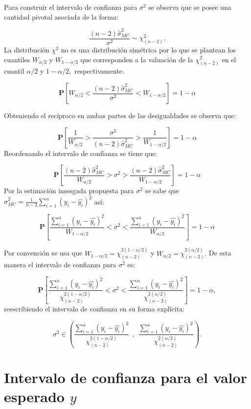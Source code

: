 \documentclass[a4paper,oneside,openany]{book}
\begin{document}
Para construir el intervalo de confianza para \(\sigma^2\) se observa
que se posee una cantidad pivotal asociada de la forma:

\[\frac{(n-2)\hat{\sigma}^2_{MC}}{\sigma^2}\sim \chi^2_{(n-2)}.\] La
distribución \(\chi^2\) no es una distribución simétrica por lo que se
plantean los cuantiles \(W_{\alpha/2}\) y \(W_{1-\alpha/2}\) que
corresponden a la valuación de la \(\chi^2_{(n-2)}\) en el cuantil
\(\alpha/2\) y \(1-\alpha/2,\) respectivamente.

\[\mathbf{P}\left[W_{\alpha/2}<\frac{(n-2)\hat{\sigma}^2_{MC}}{\sigma^2}< W_{1-\alpha/2}\right]=1-\alpha\]

Obteniendo el recíproco en ambas partes de las desigualdades se observa
que:

\[\mathbf{P}\left[\frac{1}{W_{\alpha/2}}>\frac{\sigma^2}{(n-2)\hat{\sigma}^2_{MC}}>\frac{1} {W_{1-\alpha/2}}\right]=1-\alpha\]
Reordenando el intervalo de confianza se tiene que:

\[\mathbf{P}\left[\frac{(n-2)\hat{\sigma}^2_{MC}}{W_{\alpha/2}}>\sigma^2>\frac{(n-2)\hat{\sigma}^2_{MC}} {W_{1-\alpha/2}}\right]=1-\alpha\]
Por la estimación insesgada propuesta para \(\sigma^2\) se sabe que
\(\hat{\sigma}^2_{MC}=\frac{1}{n-2}\sum_{i=1}^{n}(y_i-\hat{y_{i}})^2\)
así:

\[\mathbf{P}\left[\frac{\sum_{i=1}^{n}(y_i-\hat{y_{i}})^2}{W_{1-\alpha/2}}<\sigma^2<\frac{\sum_{i=1}^{n}(y_i-\hat{y_{i}})^2} {W_{\alpha/2}}\right]=1-\alpha\]

Por convención se usa que
\(W_{1-\alpha/2}=\chi^{2(1-\alpha/2)}_{(n-2)}\) y
\(W_{\alpha/2}=\chi^{2(\alpha/2)}_{(n-2)}.\) De esta manera el intervalo
de confianza para \(\sigma^2\) es:

\[\mathbf{P}\left[\frac{\sum_{i=1}^{n}(y_i-\hat{y_{i}})^2}{\chi^{2(1-\alpha/2)}_{(n-2)}}<\sigma^2<\frac{\sum_{i=1}^{n}(y_i-\hat{y_{i}})^2} {\chi^{2(\alpha/2)}_{(n-2)}}\right]=1-\alpha,\]
reescribiendo el intervalo de confianza en su forma explícita:

\[\sigma^2 \in \left( \frac{\sum_{i=1}^{n}(y_i-\hat{y_{i}})^2}{\chi^{2(1-\alpha/2)}_{(n-2)}} \ \ , \ \ \frac{\sum_{i=1}^{n}(y_i-\hat{y_{i}})^2} {\chi^{2(\alpha/2)}_{(n-2)}} \right).\]

\section{\texorpdfstring{Intervalo de confianza para el valor esperado
\(y\)}{Intervalo de confianza para el valor esperado y}}\label{intervalo-de-confianza-para-el-valor-esperado-y}
\end{document}
